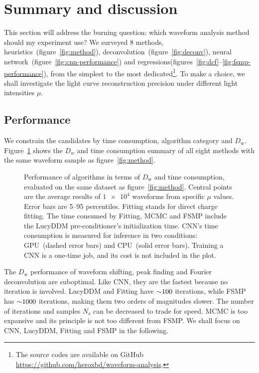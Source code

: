 \section{Summary and discussion}
\label{sec:discussion}

This section will address the burning question: which waveform analysis method should my experiment use?  We surveyed 8 methods, heuristics~(figure~\ref{fig:method}), deconvolution~(figure~\ref{fig:deconv}), neural network~(figure~\ref{fig:cnn-performance}) and regressions(figures~\ref{fig:dcf}--\ref{fig:fsmp-performance}), from the simplest to the most dedicated\footnote{The source codes are available on GitHub \url{https://github.com/heroxbd/waveform-analysis}.}.  To make a choice, we shall investigate the light curve reconstruction precision under different light intensities $\mu$.

\subsection{Performance}

We constrain the candidates by time consumption, algorithm category and $D_\mathrm{w}$.  Figure~\ref{fig:chargesummary} shows the $D_w$ and time consumption summary of all eight methods with the same waveform sample as figure~\ref{fig:method}.
\begin{figure}[H]
    \centering
    \resizebox{\textwidth}{!}{}
    \caption{\label{fig:chargesummary} Performance of algorithms in terms of $D_\mathrm{w}$ and time consumption, evaluated on the same dataset as figure~\ref{fig:method}. Central points are the average results of $\num[retain-unity-mantissa=false]{1e4}$ waveforms from specific $\mu$ values.  Error bars are 5--95 percentiles.  Fitting stands for direct charge fitting. The time consumed by Fitting, MCMC and FSMP include the LucyDDM pre-conditioner's initialization time.  CNN's time consumption is measured for inference in two conditions: GPU\protect\footnotemark~(dashed error bars) and CPU\protect\footnotemark~(solid error bars).  Training a CNN is a one-time job, and its cost is not included in the plot.}
\end{figure}
\addtocounter{footnote}{-2}

The $D_\mathrm{w}$ performance of waveform shifting, peak finding and Fourier deconvolution are suboptimal.  Like CNN, they are the fastest because no iteration is involved.  LucyDDM and Fitting have $\num{\sim 100}$ iterations, while FSMP has $\num{\sim 1000}$ iterations, making them two orders of magnitudes slower.  The number of iterations and samples $N_s$ can be decreased to trade for speed.  MCMC is too expansive and its principle is not too different from FSMP.  We shall focus on CNN, LucyDDM, Fitting and FSMP in the following.  

